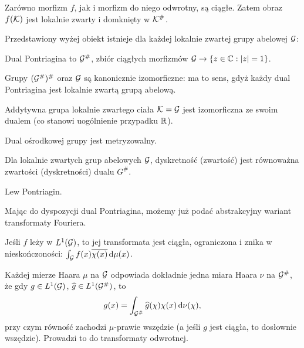 \begin{fakt}
	Zarówno morfizm $f$, jak i morfizm do niego odwrotny, są ciągłe.
	Zatem obraz $f(\mathcal K)$ jest lokalnie zwarty i domknięty w $\mathcal K^\#$.
\end{fakt}

Przedstawiony wyżej obiekt istnieje dla każdej lokalnie zwartej grupy abelowej $\mathcal G$:

\begin{definicja}
	Dual Pontriagina to $\mathcal G^\#$, zbiór ciągłych morfizmów $\mathcal G \to \{z \in \mathbb C : |z| = 1\}$.
\end{definicja}

\begin{fakt}
	Grupy $(\mathcal G^\#)^\#$ oraz $\mathcal G$ są kanonicznie izomorficzne: ma to sens, gdyż każdy dual Pontriagina jest lokalnie zwartą grupą abelową.
\end{fakt}

\begin{fakt}
	Addytywna grupa lokalnie zwartego ciała $\mathcal K = \mathcal G$ jest izomorficzna ze swoim dualem (co stanowi uogólnienie przypadku $\mathbb R$).
\end{fakt}

\begin{fakt} %
	Dual ośrodkowej grupy jest metryzowalny.
\end{fakt}

\begin{fakt}
	Dla lokalnie zwartych grup abelowych $\mathcal G$, dyskretność (zwartość) jest równoważna zwartości (dyskretności) dualu $G^\#$.
\end{fakt}

\begin{historia}
	Lew Pontriagin.
\end{historia}

Mając do dyspozycji dual Pontriagina, możemy już podać abstrakcyjny wariant transformaty Fouriera.

\begin{definicja}
	Jeśli $f$ leży w $L^1(\mathcal G)$, to jej transformata jest ciągła, ograniczona i znika w nieskończoności: $\int_\mathcal G f(x) \overline{\chi (x)} \,\textrm{d}\mu(x)$.
\end{definicja}

Każdej mierze Haara $\mu$ na $\mathcal G$ odpowiada dokładnie jedna miara Haara $\nu$ na $\mathcal G^\#$, że gdy $g \in L^1(\mathcal G)$, $\widehat g \in L^1(\mathcal G^\#)$, to
\[
	g(x) = \int_{\mathcal G^\#} \widehat g(\chi) \chi(x) \,\textrm{d} \nu(\chi),
\]
przy czym równość zachodzi $\mu$-prawie wszędzie (a jeśli $g$ jest ciągła, to dosłownie wszędzie).
Prowadzi to do transformaty odwrotnej.

